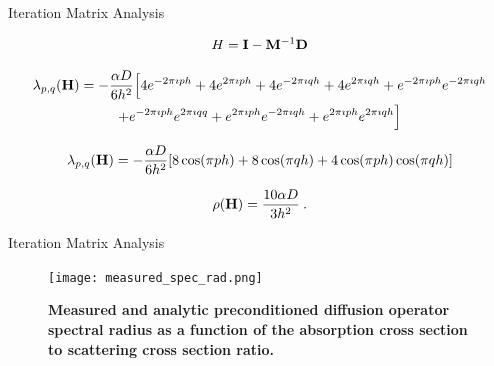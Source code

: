 \documentclass{beamer}
\begin{document}
\begin{frame}{Iteration Matrix Analysis}

\begin{equation}
  H = \mathbf{I} - \mathbf{M}^{-1} \mathbf{D}
  \label{eq:iteration_matrix}
\end{equation}

\begin{multline}
  \lambda_{p,q}(\mathbf{H}) = -\frac{\alpha D}{6h^2}\Big[4 e^{-2 \pi
      \imath p h} + 4 e^{2 \pi \imath p h} + 4 e^{-2 \pi \imath q h} +
    4 e^{2 \pi \imath q h} + e^{-2 \pi \imath p h} e^{-2 \pi \imath q
      h} \\ + e^{-2 \pi \imath p h} e^{2 \pi \imath q q} + e^{2 \pi
      \imath p h} e^{-2 \pi \imath q h} + e^{2 \pi \imath p h} e^{2
      \pi \imath q h}\Big]
  \label{eq:iteration_deriv}
\end{multline}

\begin{equation}
  \lambda_{p,q}(\mathbf{H}) = -\frac{\alpha D}{6h^2}[ 8 \cos(\pi p h) + 8
    \cos(\pi q h) + 4 \cos(\pi p h) \cos(\pi q h)]
  \label{eq:iteration_spectrum}
\end{equation}

\begin{equation}
  \rho(\mathbf{H}) = \frac{10 \alpha D}{3 h^2}\:.
  \label{eq:iteration_radius}
\end{equation}

\end{frame}

\begin{frame}{Iteration Matrix Analysis}

\begin{figure}[t!]
  \begin{center}
    \texttt{[image: measured\_spec\_rad.png]}
  \end{center}
  \caption{\textbf{Measured and analytic preconditioned diffusion
      operator spectral radius as a function of the absorption cross
      section to scattering cross section ratio.}}
  \label{fig:measured_spec_rad}
\end{figure}

\end{frame}
\end{document}

